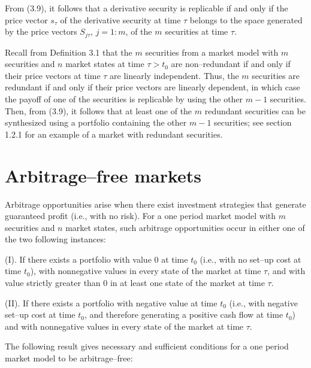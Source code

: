 
From (3.9), it follows that a derivative security is replicable if and
only if the price vector $s_\tau$ of the derivative security at time
$\tau$ belongs to the space generated by the price vectors $S_{j\tau}$,
$j = 1:m$, of the $m$ securities at time $\tau$.

Recall from Definition 3.1 that the $m$ securities from a market model
with $m$ securities and $n$ market states at time $\tau > t_0$ are
non--redundant if and only if their price vectors at time $\tau$ are
linearly independent. Thus, the $m$ securities are redundant if and only
if their price vectors are linearly dependent, in which case the payoff
of one of the securities is replicable by using the other $m-1$
securities. Then, from (3.9), it follows that at least one of the $m$
redundant securities can be synthesized using a portfolio containing the
other $m-1$ securities; see section 1.2.1 for an example of a market with
redundant securities.

\section{Arbitrage--free markets}

Arbitrage opportunities arise when there exist investment strategies that
generate guaranteed profit (i.e., with no risk). For a one period market
model with $m$ securities and $n$ market states, such arbitrage
opportunities occur in either one of the two following instances:

(I). If there exists a portfolio with value 0 at time $t_0$ (i.e., with no
set--up cost at time $t_0$), with nonnegative values in every state of the
market at time $\tau$, and with value strictly greater than 0 in at least
one state of the market at time $\tau$.

(II). If there exists a portfolio with negative value at time $t_0$ (i.e.,
with negative set--up cost at time $t_0$, and therefore generating a
positive cash flow at time $t_0$) and with nonnegative values in every
state of the market at time $\tau$.

The following result gives necessary and sufficient conditions for a one
period market model to be arbitrage--free:

